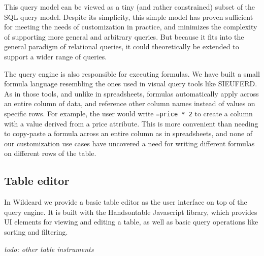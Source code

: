 \documentclass[sigplan,screen,10pt,anonymous,review]{acmart}
\begin{document}
This query model can be viewed as a tiny (and rather constrained) subset
of the SQL query model. Despite its simplicity, this simple model has
proven sufficient for meeting the needs of customization in practice,
and minimizes the complexity of supporting more general and arbitrary
queries. But because it fits into the general paradigm of relational
queries, it could theoretically be extended to support a wider range of
queries.

The query engine is also responsible for executing formulas. We have
built a small formula language resembling the ones used in visual query
tools like SIEUFERD. As in those tools, and unlike in spreadsheets,
formulas automatically apply across an entire column of data, and
reference other column names instead of values on specific rows. For
example, the user would write \texttt{=price\ *\ 2} to create a column
with a value derived from a price attribute. This is more convenient
than needing to copy-paste a formula across an entire column as in
spreadsheets, and none of our customization use cases have uncovered a
need for writing different formulas on different rows of the table.

\hypertarget{table-editor}{%
\subsection{Table editor}\label{table-editor}}

In Wildcard we provide a basic table editor as the user interface on top
of the query engine. It is built with the Handsontable Javascript
library, which provides UI elements for viewing and editing a table, as
well as basic query operations like sorting and filtering.

\emph{todo: other table instruments}
\end{document}
